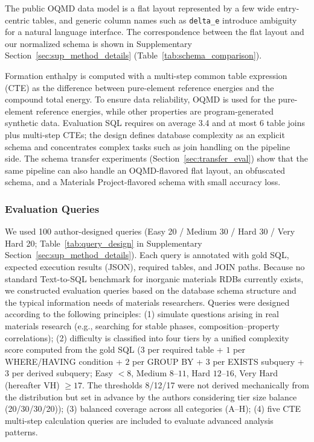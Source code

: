 The public OQMD data model is a flat layout represented by a few wide entry-centric tables, and generic column names such as \texttt{delta\_e} introduce ambiguity for a natural language interface. The correspondence between the flat layout and our normalized schema is shown in Supplementary Section~\ref{sec:sup_method_details} (Table~\ref{tab:schema_comparison}).

Formation enthalpy is computed with a multi-step common table expression (CTE) as the difference between pure-element reference energies and the compound total energy. To ensure data reliability, OQMD is used for the pure-element reference energies, while other properties are program-generated synthetic data. Evaluation SQL requires on average 3.4 and at most 6 table joins plus multi-step CTEs; the design defines database complexity as an explicit schema and concentrates complex tasks such as join handling on the pipeline side. The schema transfer experiments (Section~\ref{sec:transfer_eval}) show that the same pipeline can also handle an OQMD-flavored flat layout, an obfuscated schema, and a Materials Project-flavored schema with small accuracy loss.

\subsubsection{Evaluation Queries}
\label{sec:query_design}

We used 100 author-designed queries (Easy 20 / Medium 30 / Hard 30 / Very Hard 20; Table~\ref{tab:query_design} in Supplementary Section~\ref{sec:sup_method_details}). Each query is annotated with gold SQL, expected execution results (JSON), required tables, and JOIN paths. Because no standard Text-to-SQL benchmark for inorganic materials RDBs currently exists, we constructed evaluation queries based on the database schema structure and the typical information needs of materials researchers. Queries were designed according to the following principles:
(1) simulate questions arising in real materials research (e.g., searching for stable phases, composition--property correlations);
(2) difficulty is classified into four tiers by a unified complexity score computed from the gold SQL ($3$ per required table + $1$ per WHERE/HAVING condition + $2$ per GROUP BY + $3$ per EXISTS subquery + $3$ per derived subquery; Easy $<8$, Medium $8$--$11$, Hard $12$--$16$, Very Hard (hereafter VH) $\geq 17$. The thresholds 8/12/17 were not derived mechanically from the distribution but set in advance by the authors considering tier size balance (20/30/30/20));
(3) balanced coverage across all categories (A--H);
(4) five CTE multi-step calculation queries are included to evaluate advanced analysis patterns.

